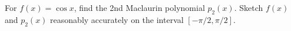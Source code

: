 For $f(x)=\cos x$, find the 2nd Maclaurin polynomial $p_2(x)$.  Sketch $f(x)$ and $p_2(x)$ reasonably accurately on the interval $[-\pi/2,\pi/2]$.